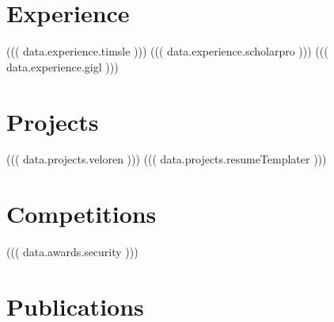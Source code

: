 \documentclass[]{deedy-resume-openfont}
\begin{document}
\begin{minipage}[t]{0.66\textwidth}


\section{Experience}

((( data.experience.timsle )))
((( data.experience.scholarpro )))
((( data.experience.gigl )))

\section{Projects}

((( data.projects.veloren )))
((( data.projects.resumeTemplater )))

\section{Competitions}

((( data.awards.security )))


\section{Publications} 
\renewcommand\refname{\vskip -1.5em} %


\nocite{*}

\end{minipage} 
\end{document}
